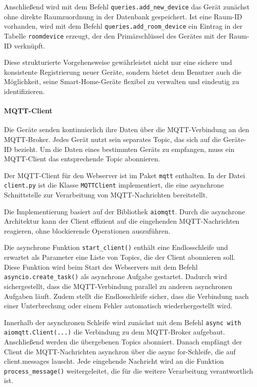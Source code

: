 \documentclass[12pt, letterpaper]{article}
\begin{document}
  \par Anschließend wird mit dem Befehl \texttt{queries.add\_new\_device} das Gerät zunächst ohne direkte Raumzuordnung in der Datenbank gespeichert. Ist eine Raum-ID vorhanden, wird mit dem Befehl \texttt{queries.add\_room\_device} ein Eintrag in der Tabelle \texttt{roomdevice} erzeugt, der den Primärschlüssel des Gerätes mit der Raum-ID verknüpft.
  \par Diese strukturierte Vorgehensweise gewährleistet nicht nur eine sichere und konsistente Registrierung neuer Geräte, sondern bietet dem Benutzer auch die Möglichkeit, seine Smart-Home-Geräte flexibel zu verwalten und eindeutig zu identifizieren.
  \paragraph{MQTT-Client}
  \par Die Geräte senden kontinuierlich ihre Daten über die MQTT-Verbindung an den MQTT-Broker. Jedes Gerät nutzt sein separates Topic, das sich auf die Geräte-ID bezieht. Um die Daten eines bestimmten Geräts zu empfangen, muss ein MQTT-Client das entsprechende Topic abonnieren.
  \par Der MQTT-Client für den Webserver ist im Paket \texttt{mqtt} enthalten. In der Datei \texttt{client.py} ist die Klasse \texttt{MQTTClient} implementiert, die eine asynchrone Schnittstelle zur Verarbeitung von MQTT-Nachrichten bereitstellt. 
  \par Die Implementierung basiert auf der Bibliothek \texttt{aiomqtt}. Durch die asynchrone Architektur kann der Client effizient auf die eingehenden MQTT-Nachrichten reagieren, ohne blockierende Operationen auszuführen.
  \par Die asynchrone Funktion \texttt{start\_client()} enthält eine Endlosschleife und erwartet als Parameter eine Liste von Topics, die der Client abonnieren soll. Diese Funktion wird beim Start des Webservers mit dem Befehl \texttt{asyncio.create\_task()} als asynchrone Aufgabe gestartet. Dadurch wird sichergestellt, dass die MQTT-Verbindung parallel zu anderen asynchronen Aufgaben läuft. Zudem stellt die Endlosschleife sicher, dass die Verbindung nach einer Unterbrechung oder einem Fehler automatisch wiederhergestellt wird.
  \par Innerhalb der asynchronen Schleife wird zunächst mit dem Befehl \texttt{async with aiomqtt.Client(...)} die Verbindung zu dem MQTT-Broker aufgebaut. Anschließend werden die übergebenen Topics abonniert. Danach empfängt der Client die MQTT-Nachrichten asynchron über die async for-Schleife, die auf client.messages lauscht. Jede eingehende Nachricht wird an die Funktion \texttt{process\_message()} weitergeleitet, die für die weitere Verarbeitung verantwortlich ist.
\end{document}
